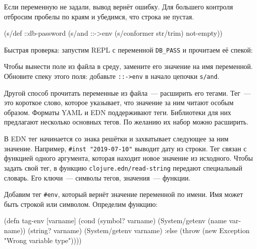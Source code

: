 \fi

Если переменную не задали, вывод вернёт ошибку. Для большего контроля
отбросим пробелы по краям и убедимся, что строка не пустая.

\begin{english}
  \begin{clojure}
(s/def ::db-password
  (s/and ::->env
         (s/conformer str/trim)
         not-empty))
  \end{clojure}
\end{english}

Быстрая проверка: запустим REPL с переменной \verb|DB_PASS| и прочитаем её
спекой:

\begin{english}
\end{english}

Чтобы вынести поле из файла в среду, замените его значение на имя
переменной. Обновите спеку этого поля: добавьте \verb|::->env| в начало цепочки
\verb|s/and|.


Другой способ прочитать переменные из файла~--- расширить его тегами. Тег~---
это короткое слово, которое указывает, что значение за ним читают особым
образом. Форматы YAML и EDN поддерживают теги. Библиотеки для них предлагают
несколько основных тегов. По желанию их набор можно расширить.


В EDN тег начинается со знака решётки и захватывает следующее за ним
значение. Например, \verb|#inst "2019-07-10"| выводит дату из строки. Тег связан
с функцией одного аргумента, которая находит новое значение из исходного. Чтобы
задать свой тег, в функцию \verb|clojure.edn/read-string| передают специальный
словарь. Его ключи~--- символы тегов, значения~--- функции.

\label{tag-env}

Добавим тег \verb|#env|, который вернёт значение переменной по имени. Имя
может быть строкой или символом. Определим функцию:

\ifnarrow

\begin{english}
  \begin{clojure}
(defn tag-env
  [varname]
  (cond
    (symbol? varname)
    (System/getenv (name varname))
    (string? varname)
    (System/getenv varname)
    :else
    (throw
      (new Exception
        "Wrong variable type"))))
  \end{clojure}
\end{english}

